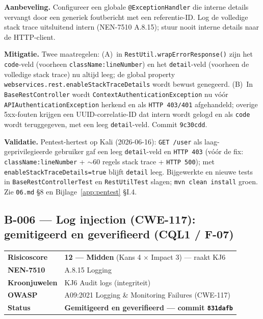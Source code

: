 \documentclass[12pt, a4paper]{report}
\newcommand{\amber}[1]{\textcolor{ragAmber}{\textbf{#1}}}
\newcommand{\groen}[1]{\textcolor{ragGreen}{\textbf{#1}}}
\begin{document}
\textbf{Aanbeveling.} Configureer een globale \texttt{@ExceptionHandler} die
interne details vervangt door een generiek foutbericht met een referentie-ID.
Log de volledige stack trace uitsluitend intern (NEN-7510 A.8.15); stuur
nooit interne details naar de HTTP-client.

\textbf{Mitigatie.} Twee maatregelen: (A)~in \texttt{RestUtil.wrapErrorResponse()}
zijn het \texttt{code}-veld (voorheen \texttt{className:lineNumber}) en het
\texttt{detail}-veld (voorheen de volledige stack trace) nu altijd leeg; de global
property \texttt{webservices.rest.enableStackTraceDetails} wordt bewust genegeerd.
(B)~In \texttt{BaseRestController} wordt \texttt{ContextAuthenticationException}
nu vóór \texttt{APIAuthenticationException} herkend en als \texttt{HTTP 403/401}
afgehandeld; overige 5xx-fouten krijgen een UUID-correlatie-ID dat intern wordt
gelogd en als \texttt{code} wordt teruggegeven, met een leeg \texttt{detail}-veld.
Commit \texttt{9c30cdd}.

\textbf{Validatie.} Pentest-hertest op Kali (2026-06-16): \texttt{GET /user} als
laag-geprivilegieerde gebruiker gaf een leeg \texttt{detail}-veld en \texttt{HTTP
403} (vóór de fix: \texttt{className:lineNumber} + $\sim$60 regels stack trace +
\texttt{HTTP 500}); met \texttt{enableStackTraceDetails=true} blijft \texttt{detail}
leeg. Bijgewerkte en nieuwe tests in \texttt{BaseRestControllerTest} en
\texttt{RestUtilTest} slagen; \texttt{mvn clean install} groen. Zie
\texttt{06.md} \S8 en Bijlage~\ref{app:pentest} \S I.4.

\subsection{B-006 --- Log injection (CWE-117): gemitigeerd en geverifieerd (CQL1 / F-07)}
\label{sec:b006}

\begin{tabular}{@{}l >{\raggedright\arraybackslash}p{11.4cm}@{}}
\textbf{Risicoscore} & \amber{12 --- Midden} (Kans 4 $\times$ Impact 3) --- raakt KJ6 \\
\textbf{NEN-7510}    & A.8.15 Logging \\
\textbf{Kroonjuwelen}& KJ6 Audit logs (integriteit) \\
\textbf{OWASP}       & A09:2021 Logging \& Monitoring Failures (CWE-117) \\
\textbf{Status}      & \groen{Gemitigeerd en geverifieerd --- commit \texttt{831dafb}} \\
\end{tabular}
\end{document}
